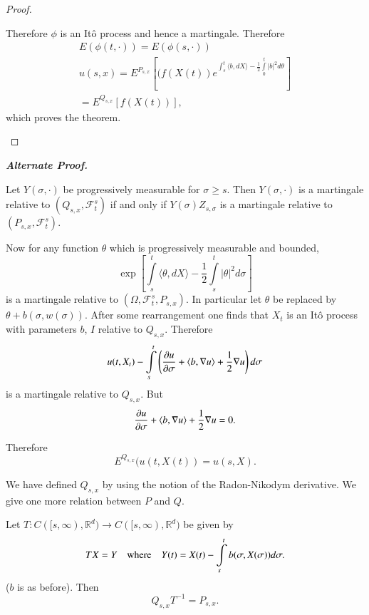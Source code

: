 \begin{proof}
\begin{step}
Therefore $\phi$ is an It\^o process and hence a martingale. Therefore
\begin{gather*}
E(\phi(t,\cdot))=E(\phi(s,\cdot))\\
u(s,x)=E^{P_{s,x}}[(f(X(t))e^{\int^{t}_{s}\langle
    b,dX\rangle-\frac{1}{2}\int\limits^{t}_{0}|b|^{2}d\theta}]\\
=E^{Q_{s,x}}[f(X(t))],
\end{gather*}
which proves the theorem.
\end{step}
\end{proof}

\noindent
{\bf\em Alternate Proof.}\pageoriginale

\begin{exer*}
Let $Y(\sigma,\cdot)$ be progressively measurable for $\sigma\geq
s$. Then $Y(\sigma,\cdot)$ is a martingale relative to
$(Q_{s,x},\mathscr{F}^{s}_{t})$ if and only if $Y(\sigma)Z_{s,\sigma}$
is a martingale relative to $(P_{s,x},\mathscr{F}^{s}_{t})$.

Now for any function $\theta$ which is progressively measurable and
boun\-ded,
$$
\exp[\int\limits^{t}_{s}\langle \theta,dX\rangle
  -\frac{1}{2}\int\limits^{t}_{s}|\theta|^{2}d\sigma]
$$
is a martingale relative to $(\Omega,\mathscr{F}^{s}_{t},P_{s,x})$. In
particular let $\theta$ be replaced by
$\theta+b(\sigma,w(\sigma))$. After some rearrangement one finds that
$X_{t}$ is an It\^o process with parameters $b$, $I$ relative to
$Q_{s,x}$. Therefore 
$$
u(t,X_{t})-\int\limits^{t}_{s}\left(\frac{\partial u}{\partial \sigma}+\langle b,\nabla
u\rangle +\frac{1}{2}\nabla u\right)d\sigma
$$
is a martingale relative to $Q_{s,x}$. But
$$
\frac{\partial u}{\partial \sigma}+\langle b,\nabla u\rangle+\frac{1}{2}\nabla
u=0.
$$

Therefore
$$
E^{Q_{s,x}}(u(t,X(t))=u(s,X).
$$

We have defined $Q_{s,x}$ by using the notion of the Radon-Nikodym
derivative. We give one more relation between $P$ and $Q$.
\end{exer*}

\begin{theorem*}
Let $T:C([s,\infty),\mathbb{R}^{d})\to C([s,\infty), \mathbb{R}^{d})$
    be given by 
$$
TX=Y\quad\text{where}\quad
Y(t)=X(t)-\int\limits^{t}_{s}b(\sigma,X(\sigma))d\sigma.
$$
($b$ is as before). Then
$$
Q_{s,x}T^{-1}=P_{s,x}.
$$
\end{theorem*}

